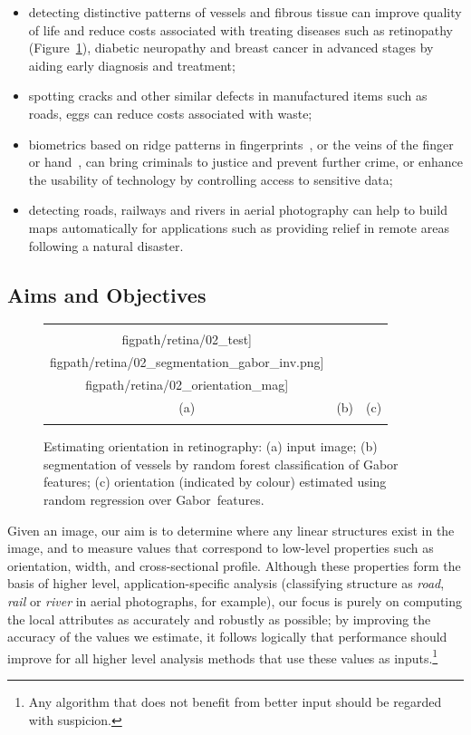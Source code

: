 \documentclass{IEEEtran}
\newcommand{\fref}[1]{Figure~\ref{#1}}
\def\figroot{./figs}
\def\figpath{\figroot}
\begin{document}
\begin{itemize}
\item detecting distinctive patterns of vessels and fibrous tissue can improve quality of life and reduce costs associated with treating diseases such as retinopathy (\fref{f:first_pic}), diabetic neuropathy and breast cancer in advanced stages by aiding early diagnosis and treatment; %
\item spotting cracks and other similar defects in manufactured items such as roads, eggs can reduce costs associated with waste; %
\item biometrics based on ridge patterns in fingerprints~\cite{}, or the veins of the finger~\cite{} or hand~\cite{}, can bring criminals to justice and prevent further crime, or enhance the usability of technology by controlling access to sensitive data; %
\item detecting roads, railways and rivers in aerial photography can help to build maps automatically for applications such as providing relief in remote areas following a natural disaster.
\end{itemize}


\subsection{Aims and Objectives}

\begin{figure}[t]
\centering
\begin{tabular}{@{}c c c@{}}
\texttt{[image: \\figpath/retina/02\_test]} &
\texttt{[image: \\figpath/retina/02\_segmentation\_gabor\_inv.png]} &
\texttt{[image: \\figpath/retina/02\_orientation\_mag]} \\
(a) & (b) & (c) \\
\noalign{\smallskip}
\end{tabular}
%
\caption{Estimating orientation in retinography: %
(a) input image; %
(b) segmentation of vessels by random forest classification of Gabor features; %
(c) orientation (indicated by colour) estimated using random regression over Gabor~features.}
\label{f:first_pic}
\end{figure}

Given an image, our aim is to determine where any linear structures exist in the image, and to measure values that correspond to low-level properties such as orientation, width, and cross-sectional profile. Although these properties form the basis of higher level, application-specific analysis (classifying structure as \emph{road}, \emph{rail} or \emph{river} in aerial photographs, for example), our focus is purely on computing the local attributes as accurately and robustly as possible; by improving the accuracy of the values we estimate, it follows logically that performance should improve for all higher level analysis methods that use these values as inputs.\footnote{Any algorithm that does not benefit from better input should be regarded with suspicion.}
\end{document}
